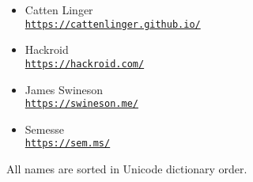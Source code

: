 


\newcommand{\sgitem}[2]{
    \noindent%
    \parbox[t][16mm][t]{\linewidth}{%
    \parskip=3pt
        \rmfamily\Large\mdseries\myvphantom#1\par
        \ttfamily\small\mdseries\myvphantom\href{#2}{#2}\par
    }\par
}
\newcommand{\sgitemalt}[2]{
    \item \textrm{\large#1}\nopagebreak\\\nopagebreak\texttt{\small\href{#2}{#2}}
}



\begin{itemize}
    \sgitemalt{Catten Linger}{https://cattenlinger.github.io/}
    \sgitemalt{Hackroid}{https://hackroid.com/}
    \sgitemalt{James Swineson}{https://swineson.me/}
    \sgitemalt{Semesse}{https://sem.ms/}
\end{itemize}


\vskip 20mm\vfill\small\rmfamily
All names are sorted in Unicode dictionary order.




